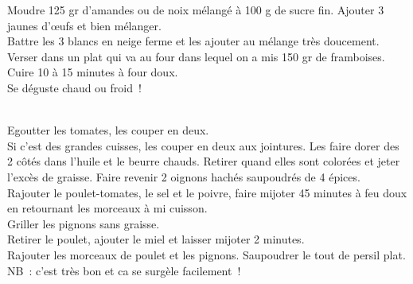\begin{minipage}[c]{\textwidth}
Moudre 125 gr d’amandes ou de noix mélangé à 100 g de sucre fin. Ajouter 3 jaunes d’œufs et bien mélanger. \\
Battre les 3 blancs en neige ferme et les ajouter au mélange très doucement. \\
Verser dans un plat qui va au four dans lequel on a mis 150 gr de framboises. Cuire 10 à 15 minutes à four doux.\\
Se déguste chaud ou froid !\\
\\

\end{minipage}

\begin{minipage}[c]{\textwidth}
Egoutter les tomates, les couper en deux. \\
Si c’est des grandes cuisses, les couper en deux aux jointures. Les faire dorer des 2 côtés dans l’huile et le beurre chauds. Retirer quand elles sont colorées et jeter l’excès de graisse. Faire revenir 2 oignons hachés saupoudrés de 4 épices.\\
Rajouter le poulet-tomates, le sel et le poivre, faire mijoter 45 minutes à feu doux en retournant les morceaux à mi cuisson.\\
Griller les pignons sans graisse. \\
Retirer le poulet, ajouter le miel et laisser mijoter 2 minutes. \\
Rajouter les morceaux de poulet et les pignons. Saupoudrer le tout de persil plat. \\
NB : c’est très bon et ca se surgèle facilement ! \\
\\

\end{minipage}

